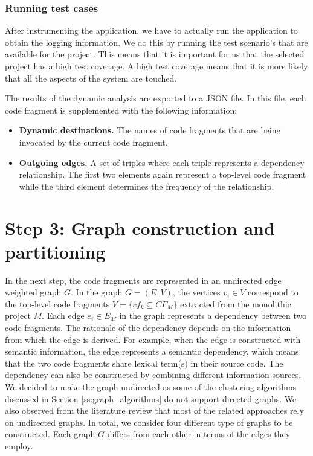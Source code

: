 \subsubsection{Running test cases}
After instrumenting the application, we have to actually run the application to obtain the logging information. We do this by running the test scenario's that are available for the project. This means that it is important for us that the selected project has a high test coverage. A high test coverage means that it is more likely that all the aspects of the system are touched. \par
The results of the dynamic analysis are exported to a JSON file. In this file, each code fragment is supplemented with the following information:

\begin{itemize}
    \item \textbf{Dynamic destinations.} The names of code fragments that are being invocated by the current code fragment.
    \item \textbf{Outgoing edges.} A set of triples where each triple represents a dependency relationship. The first two elements again represent a top-level code fragment while the third element determines the frequency of the relationship.
\end{itemize}

\section{Step 3: Graph construction and partitioning}\label{step3:graphs}
In the next step, the code fragments are represented in an undirected edge weighted graph $G$. In the graph $G = (E, V)$, the vertices $v_i \in V$ correspond to the top-level code fragments $V = \{cf_k \subseteq CF_M\}$ extracted from the monolithic project $M$. Each edge $e_i \in E_M$ in the graph represents a dependency between two code fragments. The rationale of the dependency depends on the information from which the edge is derived. For example, when the edge is constructed with semantic information, the edge represents a semantic dependency, which means that the two code fragments share lexical term(s) in their source code. The dependency can also be constructed by combining different information sources. 
We decided to make the graph undirected as some of the clustering algorithms discussed in Section \ref{ss:graph_algorithms} do not support directed graphs. We also observed from the literature review that most of the related approaches rely on undirected graphs. 
In total, we consider four different type of graphs to be constructed. Each graph $G$ differs from each other in terms of the edges they employ.

